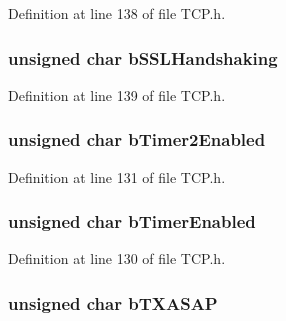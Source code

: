 Definition at line 138 of file T\+C\+P.\+h.

\hypertarget{struct_t_c_b___s_t_u_b_a63180a6b39bd41e931e34cbd85e965f0}{}
\subsubsection[{b\+S\+S\+L\+Handshaking}]{\setlength{\rightskip}{0pt plus 5cm}unsigned char b\+S\+S\+L\+Handshaking}\label{struct_t_c_b___s_t_u_b_a63180a6b39bd41e931e34cbd85e965f0}


Definition at line 139 of file T\+C\+P.\+h.

\hypertarget{struct_t_c_b___s_t_u_b_a6311e407a95b52b825d8f80d123eda7a}{}
\subsubsection[{b\+Timer2\+Enabled}]{\setlength{\rightskip}{0pt plus 5cm}unsigned char b\+Timer2\+Enabled}\label{struct_t_c_b___s_t_u_b_a6311e407a95b52b825d8f80d123eda7a}


Definition at line 131 of file T\+C\+P.\+h.

\hypertarget{struct_t_c_b___s_t_u_b_a876c8b9a4c092dc0006b7822efbeca27}{}
\subsubsection[{b\+Timer\+Enabled}]{\setlength{\rightskip}{0pt plus 5cm}unsigned char b\+Timer\+Enabled}\label{struct_t_c_b___s_t_u_b_a876c8b9a4c092dc0006b7822efbeca27}


Definition at line 130 of file T\+C\+P.\+h.

\hypertarget{struct_t_c_b___s_t_u_b_abf1b4439c5f152ddb383859e5a0f3bd3}{}
\subsubsection[{b\+T\+X\+A\+S\+A\+P}]{\setlength{\rightskip}{0pt plus 5cm}unsigned char b\+T\+X\+A\+S\+A\+P}\label{struct_t_c_b___s_t_u_b_abf1b4439c5f152ddb383859e5a0f3bd3}


